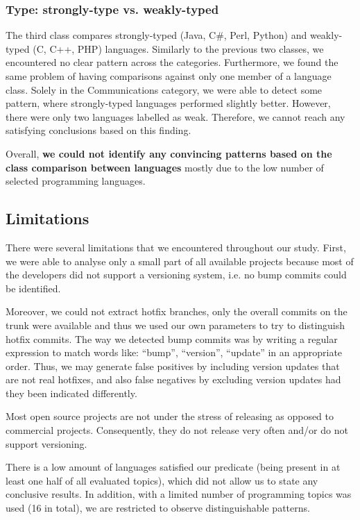 \documentclass{sig-alternate}
\begin{document}
\subsubsection*{Type: strongly-type vs. weakly-typed}
The third class compares strongly-typed (Java, C\#, Perl, Python) and weakly-typed (C, C++, PHP) languages. Similarly to the previous two classes, we encountered no clear pattern across the categories. Furthermore, we found the same problem of having comparisons against only one member of a language class. Solely in the Communications category, we were able to detect some pattern, where strongly-typed languages performed slightly better. However, there were only two languages labelled as weak. Therefore, we cannot reach any satisfying conclusions based on this finding.

Overall, \textbf{we could not identify any convincing patterns based on the class comparison between languages} mostly due to the low number of selected programming languages.

\subsection{Limitations}
There were several limitations that we encountered throughout our study. First, we were able to analyse only a small part of all available projects because most of the developers did not support a versioning system, i.e. no bump commits could be identified.

Moreover, we could not extract hotfix branches, only the overall commits on the trunk were available and thus we used our own parameters to try to distinguish hotfix commits. The way we detected bump commits was by writing a regular expression to match words like:  ``bump'', ``version'', ``update'' in an appropriate order. Thus, we may generate false positives by including version updates that are not real hotfixes, and also false negatives by excluding version updates had they been indicated differently.

Most open source projects are not under the stress of releasing as opposed to commercial projects. Consequently, they do not release very often and/or do not support versioning.

There is a low amount of languages satisfied our predicate (being present in at least one half of all evaluated topics), which did not allow us to state any conclusive results. In addition, with a limited number of programming topics was used (16 in total), we are restricted to observe distinguishable patterns.
\end{document}
